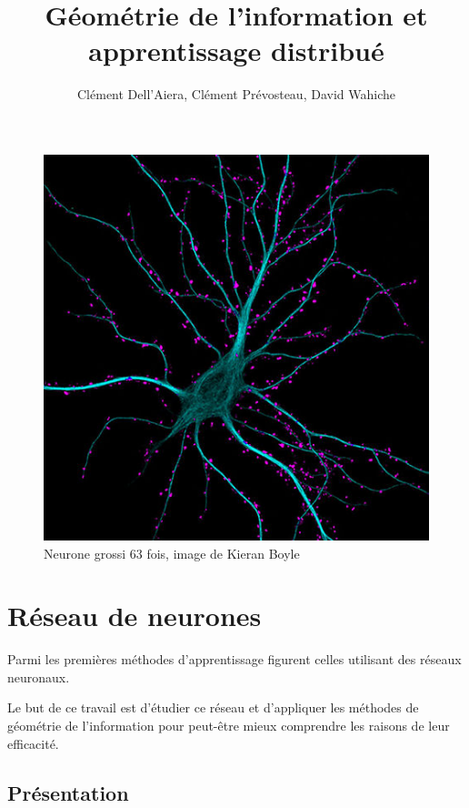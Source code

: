 \documentclass{article}
\title{Géométrie de l'information et apprentissage distribué}
\author{Clément Dell'Aiera, Clément Prévosteau, David Wahiche}
\date{}
\theoremstyle{definition}
\begin{document}
\maketitle

\begin{figure}[h]\centering
\includegraphics[scale=0.6]{Neurone.jpg}
\caption{Neurone grossi 63 fois, image de Kieran Boyle}
\label{fig:Neurone}
\end{figure}

\newpage
\tableofcontents

\newpage
\begin{abstract}
\end{abstract}
\section{Réseau de neurones}
Parmi les premières méthodes d'apprentissage figurent celles utilisant des réseaux neuronaux. %

Le but de ce travail est d'étudier ce réseau et d'appliquer les méthodes de géométrie de l'information pour peut-être mieux comprendre les raisons de leur efficacité.%
\subsection{Présentation}
\end{document}
